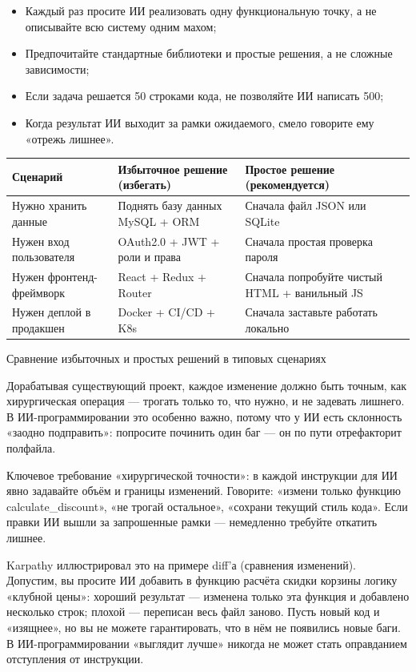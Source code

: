 \begin{itemize}
  \item Каждый раз просите ИИ реализовать одну функциональную точку, а не описывайте всю систему одним махом;
  \item Предпочитайте стандартные библиотеки и простые решения, а не сложные зависимости;
  \item Если задача решается 50 строками кода, не позволяйте ИИ написать 500;
  \item Когда результат ИИ выходит за рамки ожидаемого, смело говорите ему «отрежь лишнее».
\end{itemize}

\begin{center}
\begin{tabularx}{\linewidth}{|X|X|X|}
\hline
\textbf{Сценарий} & \textbf{Избыточное решение (избегать)} & \textbf{Простое решение (рекомендуется)} \tabularnewline
\hline
Нужно хранить данные & Поднять базу данных MySQL + ORM & Сначала файл JSON или SQLite \tabularnewline
Нужен вход пользователя & OAuth2.0 + JWT + роли и права & Сначала простая проверка пароля \tabularnewline
Нужен фронтенд-фреймворк & React + Redux + Router & Сначала попробуйте чистый HTML + ванильный JS \tabularnewline
Нужен деплой в продакшен & Docker + CI/CD + K8s & Сначала заставьте работать локально \tabularnewline
\hline
\end{tabularx}
\end{center}

\begin{center}\small\color{gray}Сравнение избыточных и простых решений в типовых сценариях\end{center}


Дорабатывая существующий проект, каждое изменение должно быть точным, как хирургическая операция — трогать только то, что нужно, и не задевать лишнего. В ИИ-программировании это особенно важно, потому что у ИИ есть склонность «заодно подправить»: попросите починить один баг — он по пути отрефакторит полфайла.

Ключевое требование «хирургической точности»: в каждой инструкции для ИИ явно задавайте объём и границы изменений. Говорите: «измени только функцию calculate\_discount», «не трогай остальное», «сохрани текущий стиль кода». Если правки ИИ вышли за запрошенные рамки — немедленно требуйте откатить лишнее.

Karpathy иллюстрировал это на примере diff'а (сравнения изменений). Допустим, вы просите ИИ добавить в функцию расчёта скидки корзины логику «клубной цены»: хороший результат — изменена только эта функция и добавлено несколько строк; плохой — переписан весь файл заново. Пусть новый код и «изящнее», но вы не можете гарантировать, что в нём не появились новые баги. В ИИ-программировании «выглядит лучше» никогда не может стать оправданием отступления от инструкции.

